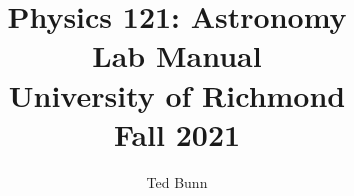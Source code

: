 \documentclass[twoside]{report}
\renewcommand{\chaptername}{Lab}
\begin{document}
\title{Physics 121: Astronomy \\ Lab Manual \\ University of Richmond
\\ Fall 2021}
\author{Ted Bunn}
\maketitle
\tableofcontents





%


















%

%










\appendix
\renewcommand{\chaptername}{Appendix}
%


\end{document}
